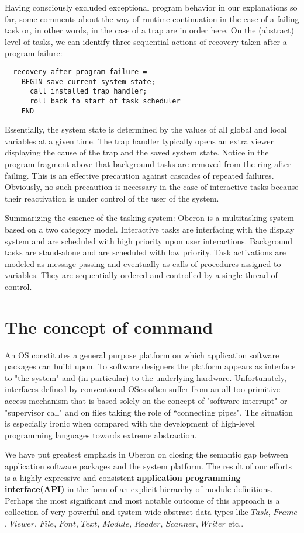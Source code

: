 Having consciously excluded exceptional program behavior in our explanations so far, some
comments about the way of runtime continuation in the case of a failing task or, in other words, in
the case of a trap are in order here. On the (abstract) level of tasks, we can identify three
sequential actions of recovery taken after a program failure:
\begin{verbatim}
  recovery after program failure =
    BEGIN save current system state;
      call installed trap handler;
      roll back to start of task scheduler
    END
\end{verbatim}
Essentially, the system state is determined by the values of all global and local variables at a
given time. The trap handler typically opens an extra viewer displaying the cause of the trap and
the saved system state. Notice in the program fragment above that background tasks are
removed from the ring after failing. This is an effective precaution against cascades of repeated
failures. Obviously, no such precaution is necessary in the case of interactive tasks because their
reactivation is under control of the user of the system.

Summarizing the essence of the tasking system: Oberon is a multitasking system based on a two
category model. Interactive tasks are interfacing with the display system and are scheduled with
high priority upon user interactions. Background tasks are stand-alone and are scheduled with low
priority. Task activations are modeled as message passing and eventually as calls of procedures
assigned to variables. They are sequentially ordered and controlled by a single thread of control.

\section{The concept of command}
An OS constitutes a general purpose platform on which application software
packages can build upon. To software designers the platform appears as interface to "the system"
and (in particular) to the underlying hardware. Unfortunately, interfaces defined by conventional
OSes often suffer from an all too primitive access mechanism that is based solely on
the concept of "software interrupt" or "supervisor call" and on files taking the role of “connecting
pipes". The situation is especially ironic when compared with the development of high-level
programming languages towards extreme abstraction.

We have put greatest emphasis in Oberon on closing the semantic gap between application
software packages and the system platform. The result of our efforts is a highly expressive and
consistent \textbf{application programming interface(API)} in the form of an explicit hierarchy of module
definitions. Perhaps the most significant and most notable outcome of this approach is a collection
of very powerful and system-wide abstract data types like $Task$, $Frame$, $Viewer$, $File$, $Font$, $Text$, $Module$, $Reader$, $Scanner$, $Writer$ etc..

